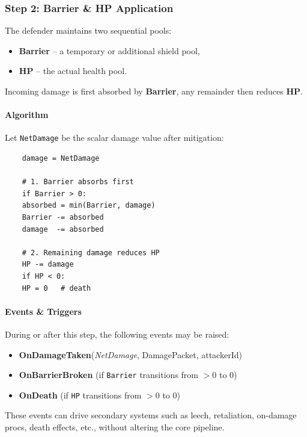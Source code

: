 \subsubsection{Step 2: Barrier \& HP Application}

The defender maintains two sequential pools:

\begin{itemize}
	\item \textbf{Barrier} – a temporary or additional shield pool,
	\item \textbf{HP} – the actual health pool.
\end{itemize}

Incoming damage is first absorbed by \textbf{Barrier}, any remainder then reduces \textbf{HP}.

\paragraph{Algorithm}

Let \texttt{NetDamage} be the scalar damage value after mitigation:

\begin{verbatim}
	damage = NetDamage
	
	# 1. Barrier absorbs first
	if Barrier > 0:
	absorbed = min(Barrier, damage)
	Barrier -= absorbed
	damage  -= absorbed
	
	# 2. Remaining damage reduces HP
	HP -= damage
	if HP < 0:
	HP = 0   # death
\end{verbatim}

\paragraph{Events \& Triggers}

During or after this step, the following events may be raised:

\begin{itemize}
	\item \textbf{OnDamageTaken}(\textit{NetDamage}, DamagePacket, attackerId)
	\item \textbf{OnBarrierBroken} (if \texttt{Barrier} transitions from $>0$ to $0$)
	\item \textbf{OnDeath} (if \texttt{HP} transitions from $>0$ to $0$)
\end{itemize}

These events can drive secondary systems such as leech, retaliation,
on-damage procs, death effects, etc., without altering the core pipeline.

